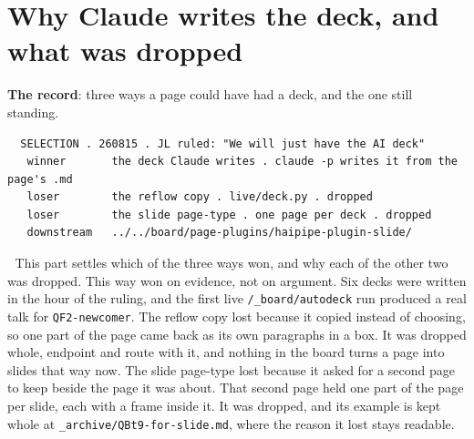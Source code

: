\section{Why Claude writes the deck, and what was dropped}
\textbf{The record}: three ways a page could have had a deck, and the one still standing.

\begin{verbatim}
  SELECTION . 260815 . JL ruled: "We will just have the AI deck"
   winner       the deck Claude writes . claude -p writes it from the page's .md
   loser        the reflow copy . live/deck.py . dropped
   loser        the slide page-type . one page per deck . dropped
   downstream   ../../board/page-plugins/haipipe-plugin-slide/
\end{verbatim}
📌 This part settles which of the three ways won, and why each of the other two was dropped. This way won on evidence, not on argument. Six decks were written in the hour of the ruling, and the first live \texttt{/\_board/autodeck} run produced a real talk for \texttt{QF2-newcomer}. The reflow copy lost because it copied instead of choosing, so one part of the page came back as its own paragraphs in a box. It was dropped whole, endpoint and route with it, and nothing in the board turns a page into slides that way now. The slide page-type lost because it asked for a second page to keep beside the page it was about. That second page held one part of the page per slide, each with a frame inside it. It was dropped, and its example is kept whole at \texttt{\_archive/QBt9-for-slide.md}, where the reason it lost stays readable.

